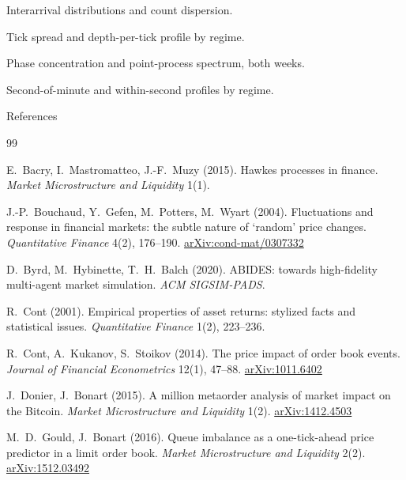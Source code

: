 \documentclass[aspectratio=169,10pt]{beamer}
\begin{document}
{Interarrival distributions and count dispersion.}

{Tick spread and depth-per-tick profile by regime.}

{Phase concentration and point-process spectrum, both weeks.}

{Second-of-minute and within-second profiles by regime.}

\begin{frame}[allowframebreaks]{References}
\footnotesize
\begin{thebibliography}{99}

E.~Bacry, I.~Mastromatteo, J.-F.~Muzy (2015).
\newblock Hawkes processes in finance.
\newblock \emph{Market Microstructure and Liquidity} 1(1).

J.-P.~Bouchaud, Y.~Gefen, M.~Potters, M.~Wyart (2004).
\newblock Fluctuations and response in financial markets: the subtle nature of `random' price changes.
\newblock \emph{Quantitative Finance} 4(2), 176--190.
\newblock \href{https://arxiv.org/abs/cond-mat/0307332}{arXiv:cond-mat/0307332}

D.~Byrd, M.~Hybinette, T.~H.~Balch (2020).
\newblock ABIDES: towards high-fidelity multi-agent market simulation.
\newblock \emph{ACM SIGSIM-PADS}.

R.~Cont (2001).
\newblock Empirical properties of asset returns: stylized facts and statistical issues.
\newblock \emph{Quantitative Finance} 1(2), 223--236.

R.~Cont, A.~Kukanov, S.~Stoikov (2014).
\newblock The price impact of order book events.
\newblock \emph{Journal of Financial Econometrics} 12(1), 47--88.
\newblock \href{https://arxiv.org/abs/1011.6402}{arXiv:1011.6402}

J.~Donier, J.~Bonart (2015).
\newblock A million metaorder analysis of market impact on the Bitcoin.
\newblock \emph{Market Microstructure and Liquidity} 1(2).
\newblock \href{https://arxiv.org/abs/1412.4503}{arXiv:1412.4503}

M.~D.~Gould, J.~Bonart (2016).
\newblock Queue imbalance as a one-tick-ahead price predictor in a limit order book.
\newblock \emph{Market Microstructure and Liquidity} 2(2).
\newblock \href{https://arxiv.org/abs/1512.03492}{arXiv:1512.03492}


\end{thebibliography}
\end{frame}
\end{document}
